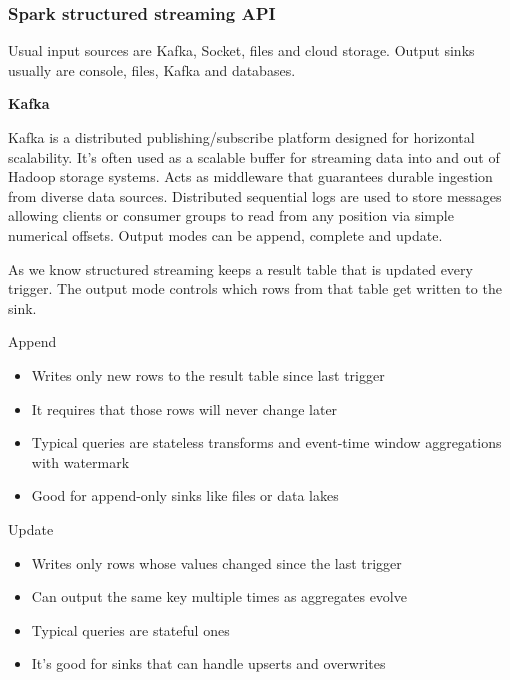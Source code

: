 \subsubsection{Spark structured streaming API}

Usual input sources are Kafka, Socket, files and cloud storage. Output sinks usually are console, files, Kafka and databases. 

\vspace{10pt}
\textbf{Kafka}
\vspace{10pt}

Kafka is a distributed publishing/subscribe platform designed for horizontal scalability. It's often used as a scalable buffer for streaming data into and out of Hadoop storage systems. Acts as middleware that guarantees durable ingestion from diverse data sources. Distributed sequential logs are used to store messages allowing clients or consumer groups to read from any position via simple numerical offsets. Output modes can be append, complete and update. 

\vspace{10pt}

As we know structured streaming keeps a result table that is updated every trigger. The output mode controls which rows from that table get written to the sink. 

\vspace{10pt}

Append

\begin{itemize}
    \item Writes only new rows to the result table since last trigger
    \item It requires that those rows will never change later
    \item Typical queries are stateless transforms and event-time window aggregations with watermark
    \item Good for append-only sinks like files or data lakes
\end{itemize}

Update
\begin{itemize}
    \item Writes only rows whose values changed since the last trigger
    \item Can output the same key multiple times as aggregates evolve
    \item Typical queries are stateful ones
    \item It's good for sinks that can handle upserts and overwrites
\end{itemize}

